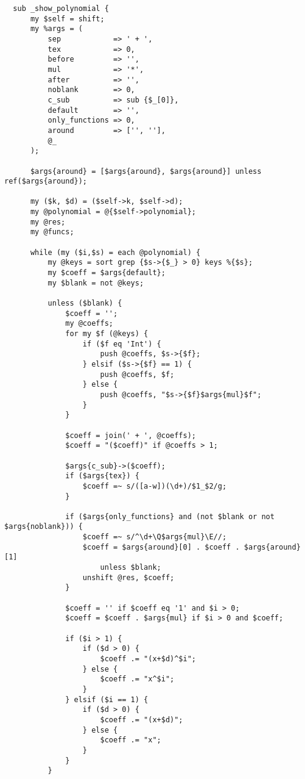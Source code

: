 \documentclass[bibliography=totoc, a4paper, 14pt]{extarticle}
\begin{document}
\begin{footnotesize}
\begin{verbatim}
  sub _show_polynomial {
      my $self = shift;
      my %args = (
          sep            => ' + ',
          tex            => 0,
          before         => '',
          mul            => '*',
          after          => '',
          noblank        => 0,
          c_sub          => sub {$_[0]},
          default        => '',
          only_functions => 0,
          around         => ['', ''],
          @_
      );

      $args{around} = [$args{around}, $args{around}] unless ref($args{around});

      my ($k, $d) = ($self->k, $self->d);
      my @polynomial = @{$self->polynomial};
      my @res;
      my @funcs;

      while (my ($i,$s) = each @polynomial) {
          my @keys = sort grep {$s->{$_} > 0} keys %{$s};
          my $coeff = $args{default};
          my $blank = not @keys;

          unless ($blank) {
              $coeff = '';
              my @coeffs;
              for my $f (@keys) {
                  if ($f eq 'Int') {
                      push @coeffs, $s->{$f};
                  } elsif ($s->{$f} == 1) {
                      push @coeffs, $f;
                  } else {
                      push @coeffs, "$s->{$f}$args{mul}$f";
                  }
              }

              $coeff = join(' + ', @coeffs);
              $coeff = "($coeff)" if @coeffs > 1;

              $args{c_sub}->($coeff);
              if ($args{tex}) {
                  $coeff =~ s/([a-w])(\d+)/$1_$2/g;
              }

              if ($args{only_functions} and (not $blank or not $args{noblank})) {
                  $coeff =~ s/^\d+\Q$args{mul}\E//;
                  $coeff = $args{around}[0] . $coeff . $args{around}[1]
                      unless $blank;
                  unshift @res, $coeff;
              }

              $coeff = '' if $coeff eq '1' and $i > 0;
              $coeff = $coeff . $args{mul} if $i > 0 and $coeff;

              if ($i > 1) {
                  if ($d > 0) {
                      $coeff .= "(x+$d)^$i";
                  } else {
                      $coeff .= "x^$i";
                  }
              } elsif ($i == 1) {
                  if ($d > 0) {
                      $coeff .= "(x+$d)";
                  } else {
                      $coeff .= "x";
                  }
              }
          }


\end{verbatim}
\end{footnotesize}
\end{document}
